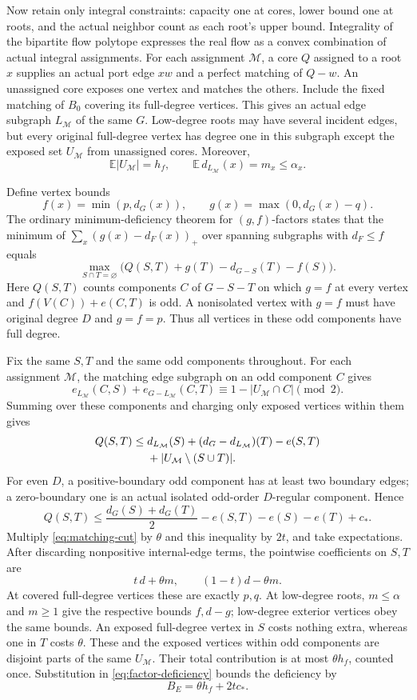 \documentclass[11pt,a4paper]{article}
\theoremstyle{definition}
\begin{document}
Now retain only integral constraints: capacity one at cores, lower bound one at roots, and the actual neighbor count as each root's upper bound. Integrality of the bipartite flow polytope expresses the real flow as a convex combination of actual integral assignments. For each assignment $\mathcal M$, a core $Q$ assigned to a root $x$ supplies an actual port edge $xw$ and a perfect matching of $Q-w$. An unassigned core exposes one vertex and matches the others. Include the fixed matching of $B_0$ covering its full-degree vertices. This gives an actual edge subgraph $L_{\mathcal M}$ of the same $G$. Low-degree roots may have several incident edges, but every original full-degree vertex has degree one in this subgraph except the exposed set $U_{\mathcal M}$ from unassigned cores. Moreover,
\[
\mathbb E|U_{\mathcal M}|=h_f,\qquad
\mathbb E\,d_{L_{\mathcal M}}(x)=m_x\le\alpha_x.
\]

Define vertex bounds
\[
f(x)=\min(p,d_G(x)),\qquad
g(x)=\max(0,d_G(x)-q).
\]
The ordinary minimum-deficiency theorem for $(g,f)$-factors \cite[Theorem 2.7 and Corollary 2.9]{luyu} states that the minimum of $\sum_x(g(x)-d_F(x))_+$ over spanning subgraphs with $d_F\le f$ equals
\begin{equation}\label{eq:factor-deficiency}
\max_{S\cap T=\varnothing}
\bigl(Q(S,T)+g(T)-d_{G-S}(T)-f(S)\bigr).
\end{equation}
Here $Q(S,T)$ counts components $C$ of $G-S-T$ on which $g=f$ at every vertex and
$f(V(C))+e(C,T)$ is odd. A nonisolated vertex with $g=f$ must have original degree $D$ and $g=f=p$. Thus all vertices in these odd components have full degree.

Fix the same $S,T$ and the same odd components throughout. For each assignment $\mathcal M$, the matching edge subgraph on an odd component $C$ gives
\[
e_{L_{\mathcal M}}(C,S)+e_{G-L_{\mathcal M}}(C,T)
\equiv1-|U_{\mathcal M}\cap C|\pmod2.
\]
Summing over these components and charging only exposed vertices within them gives
\begin{align}
Q(S,T)\le {}&
d_{L_{\mathcal M}}(S)+(d_G-d_{L_{\mathcal M}})(T)-e(S,T)\notag\\
&+|U_{\mathcal M}\setminus(S\cup T)|. \label{eq:matching-cut}
\end{align}
For even $D$, a positive-boundary odd component has at least two boundary edges; a zero-boundary one is an actual isolated odd-order $D$-regular component. Hence
\[
Q(S,T)\le
\frac{d_G(S)+d_G(T)}2-e(S,T)-e(S)-e(T)+c_*.
\]
Multiply \eqref{eq:matching-cut} by $\theta$ and this inequality by $2t$, and take expectations. After discarding nonpositive internal-edge terms, the pointwise coefficients on $S,T$ are
\[
t\,d+\theta m,\qquad (1-t)d-\theta m.
\]
At covered full-degree vertices these are exactly $p,q$. At low-degree roots, $m\le\alpha$ and $m\ge1$ give the respective bounds $f,d-g$; low-degree exterior vertices obey the same bounds. An exposed full-degree vertex in $S$ costs nothing extra, whereas one in $T$ costs $\theta$. These and the exposed vertices within odd components are disjoint parts of the same $U_{\mathcal M}$. Their total contribution is at most $\theta h_f$, counted once. Substitution in \eqref{eq:factor-deficiency} bounds the deficiency by
\[
B_E=\theta h_f+2t c_*.
\]
\end{document}

